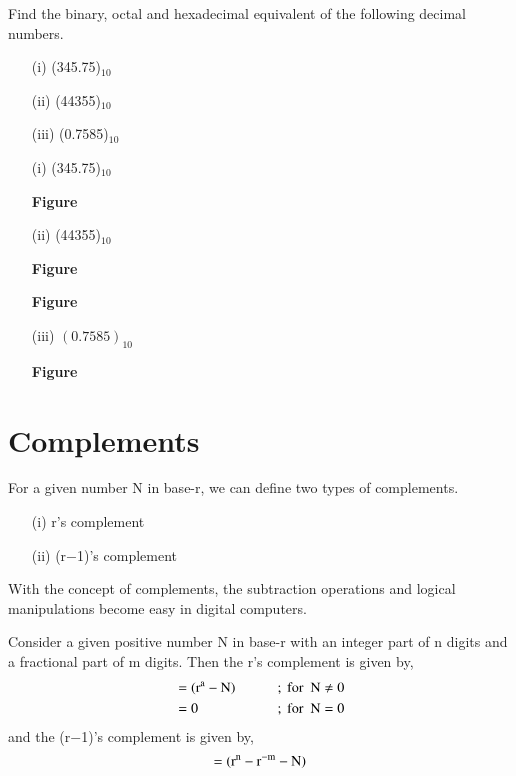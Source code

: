 \begin{problem}\label{prob5.22}
Find the binary, octal and hexadecimal equivalent of the following decimal numbers.
\begin{itemize}
\item[(i)] (345.75)$_{10}$

\item[(ii)] (44355)$_{10}$

\item[(iii)] (0.7585)$_{10}$
\end{itemize}
\end{problem}

\begin{solution}
\begin{itemize}
\item[(i)] (345.75)$_{10}$
\begin{center}
{\bf Figure}
\end{center}

\item[(ii)] (44355)$_{10}$
\begin{center}
{\bf Figure}
\end{center}
\begin{center}
{\bf Figure}
\end{center}

\item[(iii)] $(0.7585)_{10}$
\begin{center}
{\bf Figure}
\end{center}
\end{itemize}
\end{solution}

\section{Complements}\label{sec5.4}

For a given number N in base-r, we can define two types of complements.
\begin{itemize}
\item[(i)] r's complement

\item[(ii)] (r$-$1)'s complement
\end{itemize}

With the concept of complements, the subtraction operations and logical manipulations become easy in digital computers.

Consider a given positive number N in base-r with an integer part of n digits and a fractional part of m digits. Then the r's complement is given by,
\begin{alignat*}{2}
&= (\textrm{r}^{\textrm{a}}-\textrm{N}) &\qquad& ;\text{ for~ } \textrm{N}\neq 0\\
&= 0                 &\qquad& ; \text{ for~ } \textrm{N} = 0
\end{alignat*}
and the (r$-$1)'s complement is given by,
$$
=(\textrm{r}^{\textrm{n}}-\textrm{r}^{-\textrm{m}}-\textrm{N})
$$

